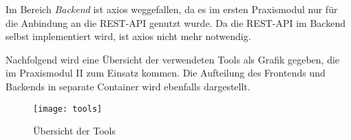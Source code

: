 Im Bereich \textit{Backend} ist axios weggefallen, da es im ersten Praxismodul nur für die Anbindung an die REST-API genutzt wurde.
Da die REST-API im Backend selbst implementiert wird, ist axios nicht mehr notwendig. %

Nachfolgend wird eine Übersicht der verwendeten Tools als Grafik gegeben, die im Praxismodul II zum Einsatz kommen.
Die Aufteilung des Frontends und Backends in separate Container wird ebenfalls dargestellt.

\begin{figure}[H]
    \centering
    \texttt{[image: tools]}
    \caption{Übersicht der Tools}\label{fig:uebersicht-tools}
\end{figure}


